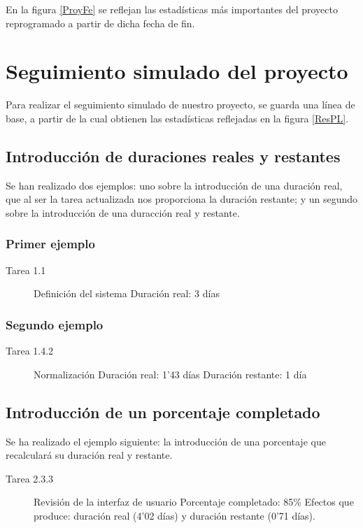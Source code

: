 \documentclass[11pt,a4paper,spanish,twoside]{book}
\begin{document}
En la figura \ref{ProyFe} se reflejan las estadísticas más importantes del
proyecto reprogramado a partir de dicha fecha de fin.

\chapter{Seguimiento simulado del proyecto}
Para realizar el seguimiento simulado de nuestro proyecto, se guarda una línea 
de base, a partir de la cual obtienen las estadísticas reflejadas en la figura 
\ref{ResPL}.


\section{Introducción de duraciones reales y restantes}
Se han realizado dos ejemplos: uno sobre la introducción de una duración
real, que al ser la tarea actualizada nos proporciona la duración restante; y
un segundo sobre la introducción de una duracción real y restante.

\subsection{Primer ejemplo}
\begin{description}
\item[Tarea 1.1] Definición del sistema \hfill
  Duración real: 3 días
\end{description}

\subsection{Segundo ejemplo}
\begin{description}
\item[Tarea 1.4.2] Normalización \hfill
  Duración real: 1'43 días
  Duración restante: 1 día
\end{description}

\section{Introducción de un porcentaje completado}
Se ha realizado el ejemplo siguiente: la introducción de una porcentaje que 
recalculará su duración real y restante.

\begin{description}
\item[Tarea 2.3.3] Revisión de la interfaz de usuario
  Porcentaje completado: 85\%
  Efectos que produce: duración real (4'02 días) y duración restante 
(0'71 días).
\end{description}
\end{document}
